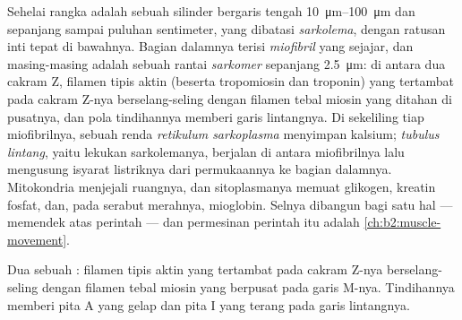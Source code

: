 \begin{definition}\label{def:b2:cell-differentiation:fibre}
Sehelai  rangka adalah sebuah silinder bergaris tengah
\qtyrange{10}{100}{\micro m} dan sepanjang sampai puluhan sentimeter,
yang dibatasi \emph{sarkolema}, dengan ratusan inti tepat di bawahnya.
Bagian dalamnya terisi \emph{miofibril} yang sejajar, dan masing-masing
adalah sebuah rantai \emph{sarkomer} sepanjang \qty{2.5}{\micro m}: di
antara dua cakram Z, filamen tipis aktin (beserta tropomiosin dan
troponin) yang tertambat pada cakram Z-nya berselang-seling dengan
filamen tebal miosin yang ditahan di pusatnya, dan pola tindihannya
memberi garis lintangnya. Di sekeliling tiap miofibrilnya, sebuah
renda \emph{retikulum sarkoplasma} menyimpan kalsium; \emph{tubulus
lintang}, yaitu lekukan sarkolemanya, berjalan di antara miofibrilnya
lalu mengusung isyarat listriknya dari permukaannya ke bagian dalamnya.
Mitokondria menjejali ruangnya, dan sitoplasmanya memuat glikogen,
kreatin fosfat, dan, pada serabut merahnya, mioglobin. Selnya dibangun
bagi satu hal --- memendek atas perintah --- dan permesinan perintah
itu adalah \cref{ch:b2:muscle-movement}.
\end{definition}

\begin{omfigure}

{\small Dua  sebuah : filamen tipis aktin yang
tertambat pada cakram Z-nya berselang-seling dengan filamen tebal
miosin yang berpusat pada garis M-nya. Tindihannya memberi pita A yang
gelap dan pita I yang terang pada garis lintangnya.}
\end{omfigure}

